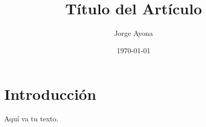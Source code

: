 \documentclass{article}
\title{Título del Artículo}
\author{Jorge Ayona}
\date{\today}
\begin{document}
\maketitle

\section{Introducción}
Aquí va tu texto.
\end{document}
